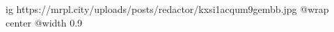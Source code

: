  
 
 
 
 

\ifcmt
  ig https://mrpl.city/uploads/posts/redactor/kxsi1acqum9gembb.jpg
  @wrap center
  @width 0.9
\fi
